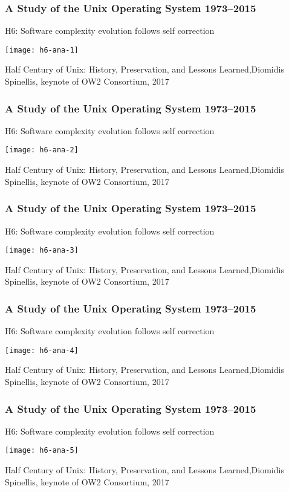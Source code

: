 \begin{frame}[plain]
	\frametitle{A Study of the Unix Operating System 1973–2015}
	\centering
	H6: Software complexity evolution
	follows self correction

	\texttt{[image: h6-ana-1]}
	
	\tiny Half Century of Unix:
	History, Preservation, and
	Lessons Learned,Diomidis Spinellis, keynote of OW2 Consortium, 2017
	
\end{frame}	

\begin{frame}[plain]
	\frametitle{A Study of the Unix Operating System 1973–2015}
	\centering
	H6: Software complexity evolution
	follows self correction
	
	\texttt{[image: h6-ana-2]}
	
	\tiny Half Century of Unix:
	History, Preservation, and
	Lessons Learned,Diomidis Spinellis, keynote of OW2 Consortium, 2017
	
\end{frame}	


\begin{frame}[plain]
	\frametitle{A Study of the Unix Operating System 1973–2015}
	\centering
	H6: Software complexity evolution
	follows self correction
	
	\texttt{[image: h6-ana-3]}
	
	\tiny Half Century of Unix:
	History, Preservation, and
	Lessons Learned,Diomidis Spinellis, keynote of OW2 Consortium, 2017
	
\end{frame}	



\begin{frame}[plain]
	\frametitle{A Study of the Unix Operating System 1973–2015}
	\centering
	H6: Software complexity evolution
	follows self correction
	
	\texttt{[image: h6-ana-4]}
	
	\tiny Half Century of Unix:
	History, Preservation, and
	Lessons Learned,Diomidis Spinellis, keynote of OW2 Consortium, 2017
	
\end{frame}	


\begin{frame}[plain]
	\frametitle{A Study of the Unix Operating System 1973–2015}
	\centering
	H6: Software complexity evolution
	follows self correction
	
	\texttt{[image: h6-ana-5]}
	
	\tiny Half Century of Unix:
	History, Preservation, and
	Lessons Learned,Diomidis Spinellis, keynote of OW2 Consortium, 2017
	
\end{frame}	




